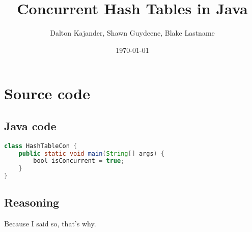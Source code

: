\documentclass{article}
\begin{document}
\author{Dalton Kajander, Shawn Guydeene, Blake Lastname}
\title{Concurrent Hash Tables in Java}
\date{\today{}}
\maketitle

\newpage
\tableofcontents
\newpage

\section{Source code}
\subsection{Java code}
\begin{lstlisting}[language={Java},caption=Testing surce code in \LaTeX{}.,breaklines=true,frame=single]
class HashTableCon {
    public static void main(String[] args) {
        bool isConcurrent = true;
    }
}
\end{lstlisting}
\subsection{Reasoning}
Because I said so, that's why. 
\end{document}
